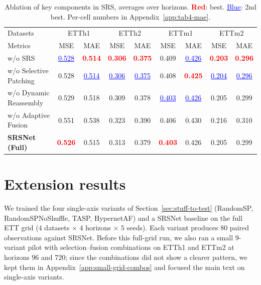 \documentclass[10pt]{article}
\begin{document}
\begin{table}[t]
  \caption{Ablation of key components in SRS, averages over
    horizons. \textcolor{red}{\textbf{Red}}: best.
    \textcolor{blue}{\underline{Blue}}: 2nd best. Per-cell numbers
    in Appendix~\ref{app:tab4-mae}.}
  \label{tab:tab4}
  \begin{center}
  \footnotesize
  \setlength{\tabcolsep}{4pt}
  \begin{tabular}{l|cc|cc|cc|cc}
    \toprule
    Datasets & \multicolumn{2}{c|}{ETTh1} & \multicolumn{2}{c|}{ETTh2}
             & \multicolumn{2}{c|}{ETTm1} & \multicolumn{2}{c}{ETTm2} \\
    Metrics  & MSE & MAE & MSE & MAE & MSE & MAE & MSE & MAE \\
    \midrule
    w/o SRS                & \textcolor{blue}{\underline{0.528}} & \textcolor{red}{\textbf{0.514}} & \textcolor{red}{\textbf{0.306}} & \textcolor{red}{\textbf{0.375}} & 0.409 & \textcolor{blue}{\underline{0.426}} & \textcolor{red}{\textbf{0.203}} & \textcolor{red}{\textbf{0.296}} \\
    w/o Selective Patching & 0.528 & \textcolor{blue}{\underline{0.514}} & \textcolor{blue}{\underline{0.306}} & \textcolor{blue}{\underline{0.375}} & 0.408 & \textcolor{red}{\textbf{0.425}} & \textcolor{blue}{\underline{0.204}} & \textcolor{blue}{\underline{0.296}} \\
    w/o Dynamic Reassembly & 0.529 & 0.518 & 0.309 & 0.378 & \textcolor{blue}{\underline{0.403}} & \textcolor{blue}{\underline{0.426}} & 0.205 & 0.299 \\
    w/o Adaptive Fusion    & 0.551 & 0.538 & 0.323 & 0.390 & 0.406 & 0.430 & 0.216 & 0.310 \\
    \midrule
    \textbf{SRSNet (Full)} & \textcolor{red}{\textbf{0.526}} & 0.515 & 0.313 & 0.379 & \textcolor{red}{\textbf{0.403}} & 0.426 & 0.205 & 0.299 \\
    \bottomrule
  \end{tabular}
  \end{center}
\end{table}

\section{Extension results}
\label{sec:results-ext}

We trained the four single-axis variants of
Section~\ref{sec:stuff-to-test} (RandomSP, RandomSPNoShuffle, TASP,
HypernetAF) and a SRSNet baseline on the full ETT grid ($4$
datasets $\times$ $4$ horizons $\times$ $5$ seeds). Each variant
produces $80$ paired observations against SRSNet.
Before this full-grid run, we also ran a small $9$-variant pilot with
selection--fusion combinations on ETTh1 and ETTm2 at horizons $96$
and $720$; since the combinations did not show a clearer pattern, we
kept them in Appendix~\ref{app:small-grid-combos} and focused the
main text on single-axis variants.
\end{document}
